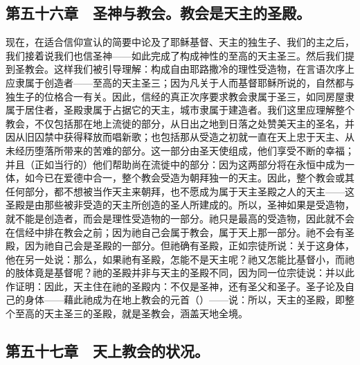 
\subsection{第五十六章　圣神与教会。教会是天主的圣殿。}

现在，在适合信仰宣认的简要中论及了耶稣基督、天主的独生子、我们的主之后，我们接着说我们也信圣神——如此完成了构成神性的至高的天主圣三。然后我们提到圣教会。这样我们被引导理解：构成自由耶路撒冷的理性受造物，在言语次序上应隶属于创造者——至高的天主圣三；因为凡关于人而基督耶稣所说的，自然都与独生子的位格合一有关。因此，信经的真正次序要求教会隶属于圣三，如同房屋隶属于居住者，圣殿隶属于占据它的天主，城市隶属于建造者。我们这里应理解整个教会，不仅包括那在地上流徙的部分，从日出之地到日落之处赞美天主的圣名，并因从旧囚禁中获得释放而唱新歌；也包括那从受造之初就一直在天上忠于天主、从未经历堕落所带来的苦难的部分。这一部分由圣天使组成，他们享受不断的幸福；并且（正如当行的）他们帮助尚在流徙中的部分：因为这两部分将在永恒中成为一体，如今已在爱德中合一，整个教会受造为朝拜独一的天主。因此，整个教会或其任何部分，都不想被当作天主来朝拜，也不愿成为属于天主圣殿之人的天主——这圣殿是由那些被非受造的天主所创造的圣人所建成的。所以，圣神如果是受造物，就不能是创造者，而会是理性受造物的一部分。祂只是最高的受造物，因此就不会在信经中排在教会之前；因为祂自己会属于教会，属于天上那一部分。祂不会有圣殿，因为祂自己会是圣殿的一部分。但祂确有圣殿，正如宗徒所说：关于这身体，他在另一处说：那么，如果祂有圣殿，怎能不是天主呢？祂又怎能比基督小，而祂的肢体竟是基督呢？祂的圣殿并非与天主的圣殿不同，因为同一位宗徒说：并以此作证明：因此，天主住在祂的圣殿内：不仅是圣神，还有圣父和圣子。圣子论及自己的身体——藉此祂成为在地上教会的元首（）——说：所以，天主的圣殿，即整个至高的天主圣三的圣殿，就是圣教会，涵盖天地全境。\par


\subsection{第五十七章　天上教会的状况。}

